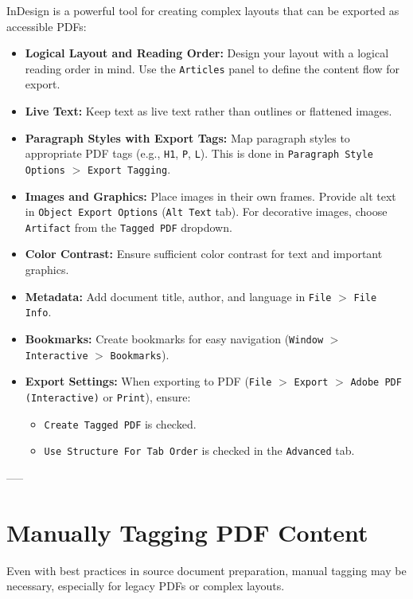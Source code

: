 InDesign is a powerful tool for creating complex layouts that can be exported as accessible PDFs:

\begin{itemize}
\item \textbf{Logical Layout and Reading Order:} Design your layout with a logical reading order in mind. Use the \texttt{Articles} panel to define the content flow for export.
\item \textbf{Live Text:} Keep text as live text rather than outlines or flattened images.
\item \textbf{Paragraph Styles with Export Tags:} Map paragraph styles to appropriate PDF tags (e.g., \texttt{H1}, \texttt{P}, \texttt{L}). This is done in \texttt{Paragraph Style Options} $>$ \texttt{Export Tagging}. \cite{AdobeInDesignPDF}
\item \textbf{Images and Graphics:} Place images in their own frames. Provide alt text in \texttt{Object Export Options} (\texttt{Alt Text} tab). For decorative images, choose \texttt{Artifact} from the \texttt{Tagged PDF} dropdown.
\item \textbf{Color Contrast:} Ensure sufficient color contrast for text and important graphics.
\item \textbf{Metadata:} Add document title, author, and language in \texttt{File} $>$ \texttt{File Info}.
\item \textbf{Bookmarks:} Create bookmarks for easy navigation (\texttt{Window} $>$ \texttt{Interactive} $>$ \texttt{Bookmarks}).
\item \textbf{Export Settings:} When exporting to PDF (\texttt{File} $>$ \texttt{Export} $>$ \texttt{Adobe PDF (Interactive)} or \texttt{Print}), ensure:
\begin{itemize}
\item \texttt{Create Tagged PDF} is checked.
\item \texttt{Use Structure For Tab Order} is checked in the \texttt{Advanced} tab.
\end{itemize}
\end{itemize}

-----

\section{Manually Tagging PDF Content}
\label{sec:manual-tagging}
Even with best practices in source document preparation, manual tagging may be necessary, especially for legacy PDFs or complex layouts.

